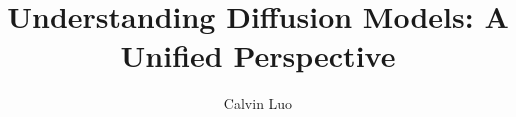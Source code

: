 \documentclass[14pt,aspectratio=169]{beamer}
\title{Understanding Diffusion Models: A Unified Perspective}
\author{Calvin Luo}
\institute[shortinst]{Google Research}
\begin{document}
{
\begin{frame}
    \titlepage
\end{frame}
}

\newcommand{\vx}{\boldsymbol{x}}
\newcommand{\vz}{\boldsymbol{z}}























\end{document}
